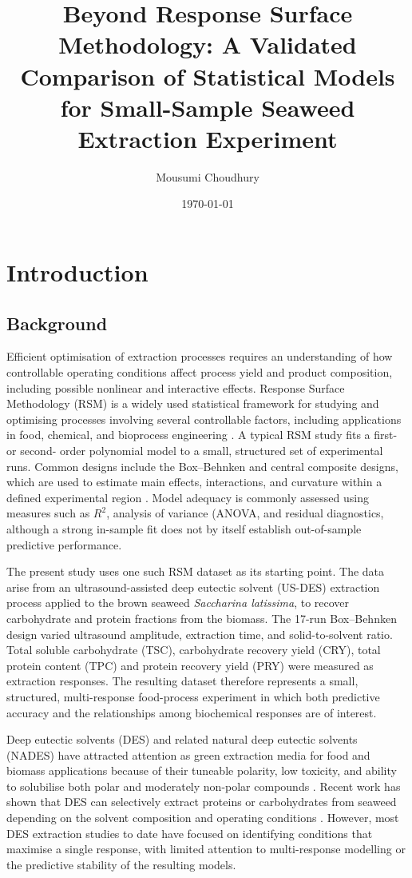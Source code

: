 \documentclass[MScDSA]{uccthesis}
\title{Beyond Response Surface Methodology: A Validated Comparison of Statistical Models for Small-Sample Seaweed Extraction Experiment}
\author{Mousumi Choudhury}
\date{\today}
\begin{document}
\chapter{Introduction}
\label{chap:introduction}
\section{Background}
\label{sec:Background}
Efficient optimisation of extraction processes requires an understanding of how controllable operating conditions affect process yield and product composition, including possible nonlinear and interactive effects. Response Surface Methodology (RSM) is a widely used statistical framework for studying and optimising processes involving several controllable factors, including applications in food, chemical, and bioprocess engineering \parencite{Bezerra:2008}. A typical RSM study fits a first- or second- order polynomial model to a small, structured set of experimental runs. Common designs include the Box--Behnken and central composite designs, which are used to estimate main effects, interactions, and curvature within a defined experimental region \parencite{Box:1960,Bezerra:2008}. Model adequacy is commonly assessed using measures such as $R^2$, analysis of variance (ANOVA, and residual diagnostics, although a strong in-sample fit does not by itself establish out-of-sample predictive performance.

The present study uses one such RSM dataset as its starting point. The data arise from an ultrasound-assisted deep eutectic solvent (US-DES) extraction process applied to the brown seaweed \textit{Saccharina latissima}, to recover carbohydrate and protein fractions from the biomass. The 17-run Box--Behnken design varied ultrasound amplitude, extraction time, and solid-to-solvent ratio. Total soluble carbohydrate (TSC), carbohydrate recovery yield (CRY), total protein content (TPC) and protein recovery yield (PRY) were measured as extraction responses. The resulting dataset therefore represents a small, structured, multi-response food-process experiment in which both predictive accuracy and the relationships among biochemical responses are of interest.

Deep eutectic solvents (DES) and related natural deep eutectic solvents (NADES) have attracted attention as green extraction media for food and biomass applications because of their tuneable polarity, low toxicity, and ability to solubilise both polar and moderately non-polar compounds \parencite{Dai:2013}. Recent work has shown that DES can selectively extract proteins or carbohydrates from seaweed depending on the solvent composition and operating conditions \parencite{Moldes:2024}. However, most DES extraction studies to date have focused on identifying conditions that maximise a single response, with limited attention to multi-response modelling or the predictive stability of the resulting models.
\end{document}
